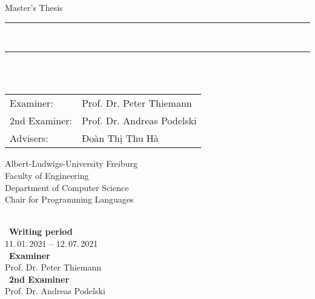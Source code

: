 
\begin{titlepage}
\begin{center}

\newcommand{\HorizontalLine}{\rule{\linewidth}{0.3mm}}

{\Large Master's Thesis}\\[1.3cm]


\HorizontalLine \\[0.4cm]
{ \huge \bfseries \thetitle }
\HorizontalLine \\[1.5cm]


{\Huge \theauthor} \\[2cm]


\begin{tabular}[hc]{>{\huge}l >{\huge}l}
  Examiner: & Prof. Dr. Peter Thiemann \\[0.3cm]
  2nd Examiner: & Prof. Dr. Andreas Podelski \\[0.3cm]
  Advisers: & Đoàn Thị Thu Hà\\[1.2cm]
\end{tabular}
\vfill  %

\Large {
    Albert-Ludwigs-University Freiburg\\
    Faculty of Engineering\\
    Department of Computer Science\\
    Chair for Programming Languages\\[1cm]
}
\end{center}
\end{titlepage}

\thispagestyle{empty}
\ \vfill \ \\  %
\
\textbf{Writing period}            \smallskip{} \\
11.\,01.\,2021 -- 12.\,07.\,2021   \bigskip{} \\
\
\textbf{Examiner}                  \smallskip{} \\
Prof. Dr. Peter Thiemann               \bigskip{} \\
\
\textbf{2nd Examiner}                  \smallskip{} \\
Prof. Dr. Andreas Podelski
